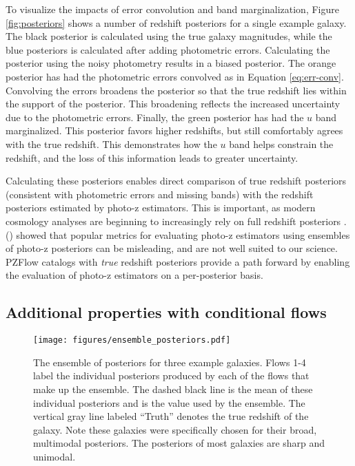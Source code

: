 \documentclass[twocolumn,twocolappendix]{aastex631}
\newcommand{\citePZt}{\citetalias{schmidt2020} (\citeyear{schmidt2020})\xspace}
\begin{document}
To visualize the impacts of error convolution and band marginalization, Figure \ref{fig:posteriors} shows a number of redshift posteriors for a single example galaxy.
The black posterior is calculated using the true galaxy magnitudes, while the blue posteriors is calculated after adding photometric errors.
Calculating the posterior using the noisy photometry results in a biased posterior.
The orange posterior has had the photometric errors convolved as in Equation \ref{eq:err-conv}.
Convolving the errors broadens the posterior so that the true redshift lies within the support of the posterior.
This broadening reflects the increased uncertainty due to the photometric errors.
Finally, the green posterior has had the $u$ band marginalized.
This posterior favors higher redshifts, but still comfortably agrees with the true redshift.
This demonstrates how the $u$ band helps constrain the redshift, and the loss of this information leads to greater uncertainty.

Calculating these posteriors enables direct comparison of true redshift posteriors (consistent with photometric errors and missing bands) with the redshift posteriors estimated by photo-z estimators.
This is important, as modern cosmology analyses are beginning to increasingly rely on full redshift posteriors \citep{mandelbaum2008,newman2022}.
\citePZt showed that popular metrics for evaluating photo-z estimators using ensembles of photo-z posteriors can be misleading, and are not well suited to our science.
PZFlow catalogs with \emph{true} redshift posteriors provide a path forward by enabling the evaluation of photo-z estimators on a per-posterior basis.


\subsection{Additional properties with conditional flows}
\label{sec:fwd-model-conditional}

\begin{figure*}[t]
    \begin{centering}
        \texttt{[image: figures/ensemble\_posteriors.pdf]}
        \caption{
            The ensemble of posteriors for three example galaxies.
            Flows 1-4 label the individual posteriors produced by each of the flows that make up the ensemble.
            The dashed black line is the mean of these individual posteriors and is the value used by the ensemble.
            The vertical gray line labeled ``Truth'' denotes the true redshift of the galaxy.
            Note these galaxies were specifically chosen for their broad, multimodal posteriors.
            The posteriors of most galaxies are sharp and unimodal.
        }
        \label{fig:ensemble-posteriors}
    \end{centering}
\end{figure*}
\end{document}
